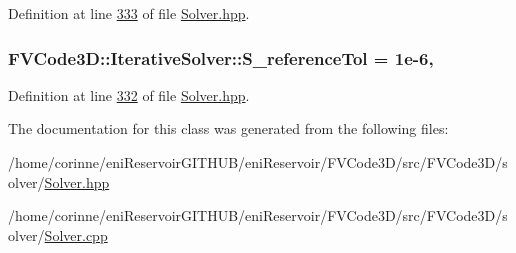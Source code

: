 Definition at line \hyperlink{Solver_8hpp_source_l00333}{333} of file \hyperlink{Solver_8hpp_source}{Solver.\+hpp}.

\subsubsection[{\texorpdfstring{S\+\_\+reference\+Tol}{S_referenceTol}}]{ F\+V\+Code3\+D\+::\+Iterative\+Solver\+::\+S\+\_\+reference\+Tol = 1e-\/6\hspace{0.3cm}{\ttfamily [static]}, {\ttfamily [protected]}}\hypertarget{classFVCode3D_1_1IterativeSolver_a2afd68f254311907309444138d7f1b89}{}\label{classFVCode3D_1_1IterativeSolver_a2afd68f254311907309444138d7f1b89}


Definition at line \hyperlink{Solver_8hpp_source_l00332}{332} of file \hyperlink{Solver_8hpp_source}{Solver.\+hpp}.



The documentation for this class was generated from the following files\+:\begin{DoxyCompactItemize}
\item 
/home/corinne/eni\+Reservoir\+G\+I\+T\+H\+U\+B/eni\+Reservoir/\+F\+V\+Code3\+D/src/\+F\+V\+Code3\+D/solver/\hyperlink{Solver_8hpp}{Solver.\+hpp}\item 
/home/corinne/eni\+Reservoir\+G\+I\+T\+H\+U\+B/eni\+Reservoir/\+F\+V\+Code3\+D/src/\+F\+V\+Code3\+D/solver/\hyperlink{Solver_8cpp}{Solver.\+cpp}\end{DoxyCompactItemize}
